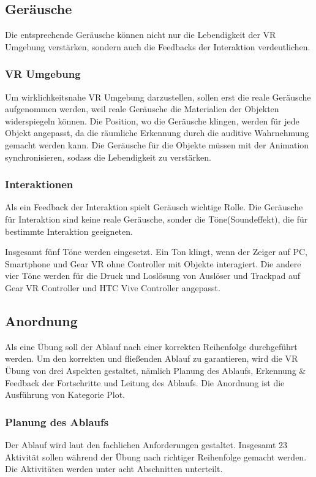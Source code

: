  \subsection{Geräusche}
 Die entsprechende Geräusche können nicht nur die Lebendigkeit der VR Umgebung verstärken, sondern auch die Feedbacks der Interaktion verdeutlichen.
 \subsubsection{VR Umgebung}
 Um wirklichkeitsnahe VR Umgebung darzustellen, sollen erst die reale Geräusche aufgenommen werden, weil reale Geräusche die Materialien der Objekten widerspiegeln können. Die Position, wo die Geräusche klingen, werden für jede Objekt angepasst, da die räumliche Erkennung durch die auditive Wahrnehmung gemacht werden kann. Die Geräusche für die Objekte müssen mit der Animation synchronisieren, sodass die Lebendigkeit zu verstärken.
 
 \subsubsection{Interaktionen}
 Als ein Feedback der Interaktion spielt Geräusch wichtige Rolle. Die Geräusche für Interaktion sind keine reale Geräusche, sonder die Töne(Soundeffekt), die für bestimmte Interaktion geeigneten.
 
 Insgesamt fünf Töne werden eingesetzt. Ein Ton klingt, wenn der Zeiger auf PC, Smartphone und Gear VR ohne Controller mit Objekte interagiert. Die andere vier Töne werden für die Druck und Loslösung von Auslöser und Trackpad auf Gear VR Controller und HTC Vive Controller angepasst.
 
 \subsection{Anordnung}
 Als eine Übung soll der Ablauf nach einer korrekten Reihenfolge durchgeführt werden. Um den korrekten und fließenden Ablauf zu garantieren, wird die VR Übung von drei Aspekten gestaltet, nämlich Planung des Ablaufs, Erkennung \& Feedback der Fortschritte und Leitung des Ablaufs. Die Anordnung ist die Ausführung von Kategorie \glqq Plot\grqq.
  \subsubsection{Planung des Ablaufs}
      
  Der Ablauf wird laut den fachlichen Anforderungen gestaltet. Insgesamt 23 Aktivität sollen während der Übung nach richtiger Reihenfolge gemacht werden. Die Aktivitäten werden unter acht Abschnitten unterteilt.
  
